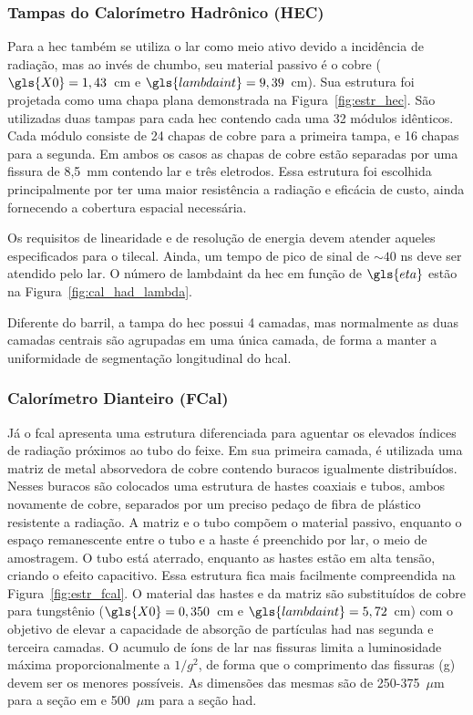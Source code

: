 \subsubsection{Tampas do Calorímetro Hadrônico (HEC)}
\label{par:cal_hec}

Para a \gls{hec} também se utiliza o \gls{lar} como meio ativo devido a
incidência de radiação, mas ao invés de chumbo, seu material passivo é o cobre
($\gls{X0} = 1,43$~cm e $\gls{lambdaint}=9,39$~cm). 
Sua estrutura foi projetada como uma chapa plana 
demonstrada na Figura~\ref{fig:estr_hec}. São utilizadas duas tampas para cada
\gls{hec} contendo cada uma 32 módulos idênticos. Cada módulo consiste de 24
chapas de cobre para a primeira tampa, e 16 chapas para a segunda. Em ambos os
casos as chapas de cobre estão separadas por uma fissura de 8,5~mm contendo
\gls{lar} e três eletrodos. Essa estrutura foi escolhida principalmente por ter
uma maior resistência a radiação e eficácia de custo, ainda fornecendo a
cobertura espacial necessária.

Os requisitos de linearidade e de resolução de energia devem atender aqueles
especificados para o \gls{tilecal}. Ainda, um tempo de pico de sinal
de $\sim40$ ns deve ser atendido pelo \gls{lar}. O número de \gls{lambdaint} da
\gls{hec} em função de $\gls{eta}$ estão na Figura~\ref{fig:cal_had_lambda}.

Diferente do barril, a tampa do \gls{hec}
possui 4 camadas, mas normalmente as duas camadas centrais são agrupadas em uma
única camada, de forma a manter a uniformidade de segmentação longitudinal do
\gls{hcal}.

\subsubsection{Calorímetro Dianteiro (FCal)}
\label{par:cal_fcal}

Já o \gls{fcal} apresenta uma estrutura diferenciada
para aguentar os elevados índices de radiação próximos ao tubo do feixe. Em sua primeira camada, 
é utilizada uma matriz de metal absorvedora de cobre contendo buracos igualmente
distribuídos. Nesses buracos são colocados uma estrutura de hastes coaxiais e tubos, 
ambos novamente de cobre, separados por um preciso pedaço de fibra de plástico resistente
a radiação. A matriz e o tubo compõem o material passivo,
enquanto o espaço remanescente entre o tubo e a haste é preenchido por \gls{lar},
o meio de amostragem. O tubo está aterrado, enquanto as hastes estão em alta tensão, 
criando o efeito capacitivo.
Essa estrutura fica mais facilmente compreendida na Figura~\ref{fig:estr_fcal}. 
O material das hastes e da matriz são substituídos de cobre para tungstênio
($\gls{X0} = 0,350$~cm e $\gls{lambdaint} = 5,72$~cm) com 
o objetivo de elevar a capacidade de absorção de partículas \gls{had} nas segunda 
e terceira camadas. O acumulo de íons de \gls{lar} nas fissuras limita a
luminosidade máxima proporcionalmente a $1/g^2$, de forma que o comprimento das
fissuras (g) devem ser os menores possíveis. 
As dimensões das mesmas são de 250-375~$\mu$m para a seção \gls{em} 
e 500~$\mu$m para a seção \gls{had}.


